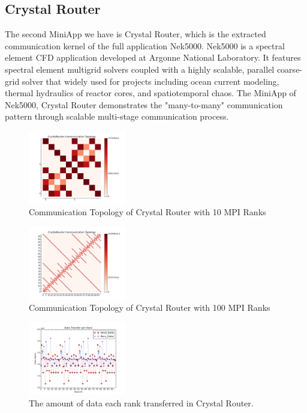 \documentclass[conference]{IEEEtran}
\begin{document}
\subsection{Crystal Router}
\label{sec:crystalrouter}

The second MiniApp we have is Crystal Router, which is the extracted communication kernel of the full application Nek5000. Nek5000\cite{crystalrouter} is a spectral element CFD application developed at Argonne National Laboratory. It features spectral element multigrid solvers coupled with a highly scalable, parallel coarse-grid solver that widely used for projects including ocean current modeling, thermal hydraulics of reactor cores, and spatiotemporal chaos. The MiniApp of Nek5000, Crystal Router demonstrates the "many-to-many" communication pattern through scalable multi-stage communication process.

\begin{figure}[h!] 
  \centering
  \includegraphics[width=0.38\textwidth]{figs/cr/cr10_ct}
   \caption{Communication Topology of Crystal Router with 10 MPI Ranks }
   \label{fig: crystalrouter10 communication topology}
\end{figure}

\begin{figure}[h!] 
  \centering
  \includegraphics[width=0.38\textwidth]{figs/cr/cr100_ct}
   \caption{Communication Topology of Crystal Router with 100 MPI Ranks }
   \label{fig: crystalrouter100 communication topology}
\end{figure}

\begin{figure}[h!] 
  \centering
  \includegraphics[width=0.38\textwidth]{figs/cr/cr_data_transfer}
   \caption{The amount of data each rank transferred in Crystal Router. }
   \label{fig: cr data trans}
\end{figure}
\end{document}
